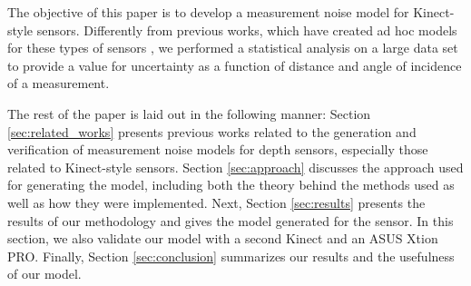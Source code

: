 
The objective of this paper is to develop a measurement noise model for
Kinect-style sensors. Differently from previous works, which have created ad hoc
models for these types of sensors \cite{Newcombe2011}\cite{Fallon2012}, we
performed a statistical analysis on a large data set to provide a value for
uncertainty as a function of distance and angle of incidence of a measurement.

The rest of the paper is laid out in the following manner: Section
\ref{sec:related_works} presents previous works related to the generation and
verification of measurement noise models for depth sensors, especially those
related to Kinect-style sensors. Section \ref{sec:approach} discusses the
approach used for generating the model, including both the theory behind the
methods used as well as how they were implemented. Next, Section
\ref{sec:results} presents the results of our methodology and gives the model
generated for the sensor. In this section, we also validate our model with a
second Kinect and an ASUS Xtion PRO. Finally, Section
\ref{sec:conclusion} summarizes our results and the usefulness of our model.


